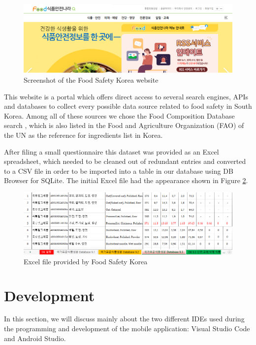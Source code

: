 \begin{figure}[h]
  \centering
  \includegraphics[width=\textwidth]{Figures/fsk.png}
  \caption{%
    Screenshot of the Food Safety Korea website
  }
  \label{fig:fsk}
\end{figure}

This website is a portal which offers direct access to several search engines, APIs and databases to collect every possible data source related to food safety in South Korea. Among all of these sources we chose the Food Composition Database search \cite{noauthor_food_nodate}, which is also listed in the Food and Agriculture Organization (FAO) of the UN as the reference for ingredients list in Korea.

After filing a small questionnaire this dataset was provided as an Excel spreadsheet, which needed to be cleaned out of redundant entries and converted to a CSV file in order to be imported into a table in our database using DB Browser for SQLite. The initial Excel file had the appearance shown in Figure \ref{fig:fsk-data}.

\begin{figure}[h]
  \centering
  \includegraphics[width=\textwidth]{Figures/fsk-data.png}
  \caption{%
    Excel file provided by Food Safety Korea
  }
  \label{fig:fsk-data}
\end{figure}

\section{Development}

In this section, we will discuss mainly about the two different IDEs used during the programming and development of the mobile application: Visual Studio Code and Android Studio.

